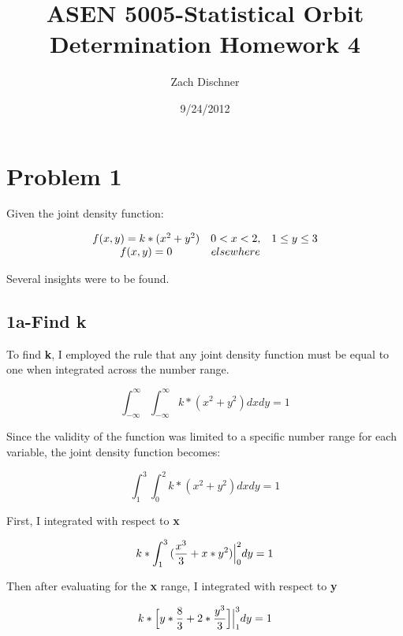 \documentclass[]{article}
\begin{document}
\title{ASEN 5005-Statistical Orbit Determination
Homework 4}
\author{Zach Dischner}
\date{9/24/2012}
\maketitle

\section{Problem 1}
Given the joint density function:

\[\begin{array}[b]{ccc}
f(x,y)=k*(x^2+y^2)   &  0<x<2,&1\le y\le 3 \cr 
 f(x,y) = 0 & elsewhere & 
\end{array}\]

Several insights were to be found.



\subsection*{1a-Find k} 
To find {\bf k}, I employed the rule that any joint density function must be equal to one when integrated across the number range. 


\begin{equation} 
	 \int_{-\infty}^\infty{\int_{-\infty}^\infty{ k*(x^2 + y^2) } dx dy} = 1 
\end{equation}

\noindent Since the validity of the function was limited to a specific number range for each variable, the joint density function  becomes:

\begin{displaymath}
	\int_1^3{\int_0^2{ k*(x^2 + y^2) } dx dy} = 1 
\end{displaymath}

\noindent First, I integrated with respect to {\bf x}

\begin{displaymath}
	{k*\int_1^3{(\frac{x^3 }{ 3} + x*y^2) } \Big{|}_0^2 dy} = 1 
\end{displaymath}

\noindent Then after evaluating for the {\bf x} range, I integrated with respect to  {\bf y}

\begin{displaymath}
	{k*\Big{ [ } y*\frac{8}{3} + 2*\frac{y^3}{3} \Big{ ] }  \Big{|}_1^3 dy} = 1 
\end{displaymath}
\end{document}
